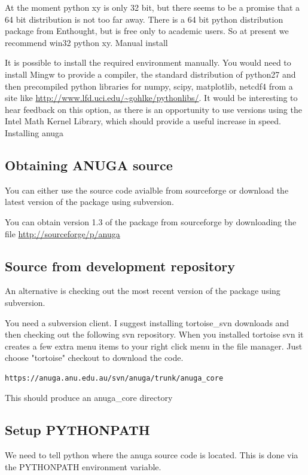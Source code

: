 \documentclass{manual}
\begin{document}
At the moment python xy is only 32 bit, but there seems to be a promise that a 64 bit distribution is not too far away. There is a 64 bit python distribution package from Enthought, but is free only to academic users. So at present we recommend win32 python xy.
Manual install

It is possible to install the required environment manually. You would need to install Mingw to provide a compiler, the standard distribution of python27 and then precompiled python libraries for numpy, scipy, matplotlib, netcdf4 from a site like  \url{http://www.lfd.uci.edu/~gohlke/pythonlibs/}. It would be interesting to hear feedback on this option, as there is an opportunity to use versions using the Intel Math Kernel Library, which should provide a useful increase in speed.
Installing anuga

\subsection{Obtaining ANUGA source}

You can either use the source code avialble from sourceforge or  download the latest version of the package using subversion. 

You can obtain version 1.3 of the package from sourceforge by downloading the file \url{http://sourceforge/p/anuga}


\subsection{Source from development repository}
An alternative is checking out the most recent version of the package using subversion. 

You need a subversion client. I suggest installing  tortoise_svn downloads and then checking out the following svn repository. When you installed tortoise svn it creates a few extra menu items to your right click menu in the file manager. Just choose "tortoise" checkout to download the code.
\begin{verbatim}
https://anuga.anu.edu.au/svn/anuga/trunk/anuga_core
\end{verbatim}
This should produce an anuga_core directory



\subsection{Setup PYTHONPATH}

We need to tell python where the anuga source code is located. This is done via the PYTHONPATH environment variable.
\end{document}
